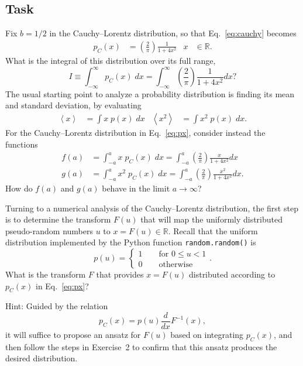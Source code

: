 \documentclass[12 pt]{article} %
\newcommand{\Rbb}{\ensuremath{\mathbb R} }
\newcommand{\vev}[1]{\ensuremath{\left\langle #1 \right\rangle} }
\newcommand{\eq}[1]{Eq.~\ref{#1}}
\newcommand{\showmarks}[1]{\rightline{\texttt{[#1 marks]}}} %
\begin{document}
\subsection*{Task}
Fix $b = 1 / 2$ in the Cauchy--Lorentz distribution, so that \eq{eq:cauchy} becomes
\begin{align}
  \label{eq:px}
  p_C(x) & = \left(\frac{2}{\pi}\right) \frac{1}{1 + 4x^2} &
  x & \in \Rbb.
\end{align}
What is the integral of this distribution over its full range,
\begin{equation*}
  I \equiv \int_{-\infty}^{\infty} p_C(x) \; dx = \int_{-\infty}^{\infty} \left(\frac{2}{\pi}\right) \frac{1}{1 + 4x^2} dx?
\end{equation*}
The usual starting point to analyze a probability distribution is finding its mean and standard deviation, by evaluating
\begin{align*}
  \vev{x} & = \int x \; p(x) \; dx &
  \vev{x^2} & = \int x^2 \; p(x) \; dx.
\end{align*}
For the Cauchy--Lorentz distribution in \eq{eq:px}, consider instead the functions
\begin{align*}
  f(a) & = \int_{-a}^a x \; p_C(x) \; dx = \int_{-a}^a \left(\frac{2}{\pi}\right) \frac{x}{1 + 4x^2} dx \\
  g(a) & = \int_{-a}^a x^2 \; p_C(x) \; dx = \int_{-a}^a \left(\frac{2}{\pi}\right) \frac{x^2}{1 + 4x^2} dx.
\end{align*}
How do $f(a)$ and $g(a)$ behave in the limit $a \to \infty$?

\showmarks{6}

\newpage %
Turning to a numerical analysis of the Cauchy--Lorentz distribution, the first step is to determine the transform $F(u)$ that will map the uniformly distributed pseudo-random numbers $u$ to $x = F(u) \in \Rbb$.
Recall that the uniform distribution implemented by the Python function \texttt{random.random()} is
\begin{equation*}
  p(u) = \left\{\begin{array}{l}1 \qquad \mbox{for } 0 \leq u < 1 \\
                                0 \qquad \mbox{otherwise}\end{array}\right. .
\end{equation*}
What is the transform $F$ that provides $x = F(u)$ distributed according to $p_C(x)$ in \eq{eq:px}?

Hint: Guided by the relation
\begin{equation*}
  p_C(x) = p(u) \frac{d}{dx} F^{-1}(x),
\end{equation*}
it will suffice to propose an ansatz for $F(u)$ based on integrating $p_C(x)$, and then follow the steps in Exercise~2 to confirm that this ansatz produces the desired distribution.
\end{document}
